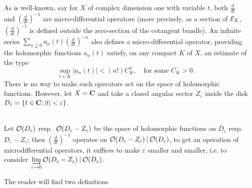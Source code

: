 As is well-known, say for \(X\) of complex dimension one 
with variable \(t\), 
both \(\frac{d}{dt}\) and \(
    \left(\frac{d}{dt}\right)^{-1}
\) are micro-differential operators (more precisely, 
as a section of \(\cE_X\), 
\(\left(\frac{d}{dt}\right)^{-1}\) is defined outside the
zero-section of the cotangent bundle). 
An infinite series \(
    \sum_{n\geqq0}^{}a_n(t)\left(\frac{d}{dt}\right)^{-n}
\) also defines a micro-differential operator, providing 
the holomorphic functions \(a_n(t)\) satisfy, 
on any compact \(K\) of \(X\), an estimate of the type 
\[
    \sup_{t\in K}\lvert a_n(t)\rvert < (n!)C_K^n,\quad\text{for~some \(C_K>0\).}
\]
There is no way to make such operators act on the space of 
holomorphic functions. However, 
let \(X=\cc\) and 
take a closed angular sector \(Z_\varepsilon\) inside 
the disk \(
    D_\varepsilon=\{t\in \cc; \lvert t\rvert <\varepsilon\}
\).
\begin{figure}[htb]
    \centering
\end{figure}\\%
Let \(\cO(D_\varepsilon)\) resp.~\(
    \cO(D_\varepsilon-Z_\varepsilon)
\) be the space of holomorphic functions on \(D_\varepsilon\) 
resp.~\(D_\varepsilon-Z_\varepsilon\); 
then \(\left(\frac{d}{dt}\right)^{-1}\) operates on \(
    \cO(D_\varepsilon-Z_\varepsilon)\mathbin{|}\cO(D_\varepsilon)
\), to get an operation of microdifferential operators,
it suffices to make \(\varepsilon\) smaller and smaller, i.e. 
to consider \(
    \indlim[\varepsilon\to0]
    \cO(D_\varepsilon-Z_\varepsilon)
    \mathbin{|}
    \cO(D_\varepsilon)
\).

The reader will find two definitions 

